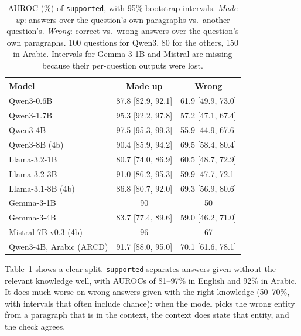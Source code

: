 \documentclass[11pt]{article}
\begin{document}
\begin{table}[t]
\centering
\small
\caption{AUROC (\%) of \texttt{supported}, with 95\% bootstrap intervals. \emph{Made up}: answers over the question's own paragraphs vs.\ another question's. \emph{Wrong}: correct vs.\ wrong answers over the question's own paragraphs. 100 questions for Qwen3, 80 for the others, 150 in Arabic. Intervals for Gemma-3-1B and Mistral are missing because their per-question outputs were lost.}
\label{tab:supported}
\begin{tabular}{lcc}
\toprule
Model & Made up & Wrong \\
\midrule
Qwen3-0.6B & 87.8 [82.9, 92.1] & 61.9 [49.9, 73.0] \\
Qwen3-1.7B & 95.3 [92.2, 97.8] & 57.2 [47.1, 67.4] \\
Qwen3-4B & 97.5 [95.3, 99.3] & 55.9 [44.9, 67.6] \\
Qwen3-8B (4b) & 90.4 [85.9, 94.2] & 69.5 [58.4, 80.4] \\
Llama-3.2-1B & 80.7 [74.0, 86.9] & 60.5 [48.7, 72.9] \\
Llama-3.2-3B & 91.0 [86.2, 95.3] & 59.9 [47.7, 72.1] \\
Llama-3.1-8B (4b) & 86.8 [80.7, 92.0] & 69.3 [56.9, 80.6] \\
Gemma-3-1B & 90 & 50 \\
Gemma-3-4B & 83.7 [77.4, 89.6] & 59.0 [46.2, 71.0] \\
Mistral-7B-v0.3 (4b) & 96 & 67 \\
Qwen3-4B, Arabic (ARCD) & 91.7 [88.0, 95.0] & 70.1 [61.6, 78.1] \\
\bottomrule
\end{tabular}
\end{table}

Table~\ref{tab:supported} shows a clear split. \texttt{supported} separates answers given without the relevant knowledge well, with AUROCs of 81--97\% in English and 92\% in Arabic. It does much worse on wrong answers given with the right knowledge (50--70\%, with intervals that often include chance): when the model picks the wrong entity from a paragraph that is in the context, the context does state that entity, and the check agrees.
\end{document}

